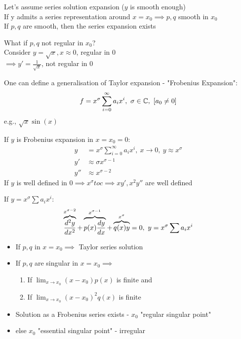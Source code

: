 \documentclass[Maths.tex]{subfiles}
\begin{document}
Let's assume series solution expansion ($y$ is smooth enough) \\
If y admits a series representation around $x = x_0 \implies p,q$ smooth in $x_0$ \\
If $p,q$ are smooth, then the series expansion exists

What if $p,q$ not regular in $x_0$? \\
Consider $y = \sqrt{x}, x \approx 0$, regular in $0$ \\
$\implies y' = \frac{1}{\sqrt{x}}$, not regular in $0$

One can define a generalisation of Taylor expansion - "Frobenius Expansion":
\begin{equation*}
    f = x^\sigma \sum_{i=0}^\infty a_i x^i, ~ \sigma \in \mathbb{C}, ~ [a_0 \neq 0]
\end{equation*}
e.g., $\sqrt{x}\sin(x)$

If $y$ is Frobenius expansion in $x = x_0 = 0$:
\begin{align*}
    y &= x^\sigma \sum_{i=0}^\infty a_ix^i, ~ x \to 0, ~ y \approx x^\sigma \\
    y' &\approx \sigma x^{\sigma - 1} \\
    y'' &\approx x^{\sigma-2}
\end{align*}
If $y$ is well defined in $0 \implies x^\sigma to c \implies xy', x^2y''$ are well defined

If $y = x^\sigma \sum a_ix^i$:
\begin{equation*}
    \overbrace{\frac{d^2 y}{dx^2}}^{x^{\sigma-2}} + \overbrace{p(x)\frac{dy}{dx}}^{x^{\sigma-1}} + \overbrace{q(x)y}^{x^\sigma} = 0, ~ y = x^\sigma \sum a_ix^i
\end{equation*}
\newpage
\begin{itemize}
    \item If $p,q$ in $x = x_0 \implies$ Taylor series solution
    \item If $p,q$ are singular in $x = x_0 \implies$
    \begin{enumerate}
        \item If $\lim_{x\to x_0} (x-x_0)p(x)$ is finite and
        \item If $\lim_{x \to x_0} (x-x_0)^2q(x)$ is finite
    \end{enumerate}
    \item Solution as a Frobenius series exists - $x_0$ "regular singular point"
    \item else $x_0$ "essential singular point" - irregular
\end{itemize}
\end{document}
